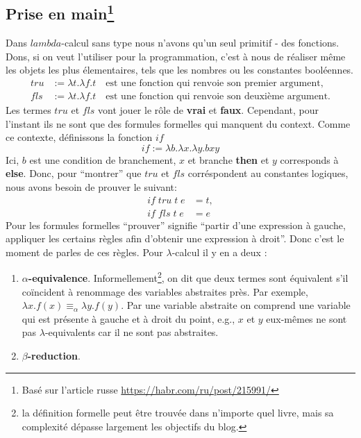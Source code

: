 \documentclass[12pt, a4paper]{article}
\newtheorem*{remark}{Remarque}
\begin{document}
\subsection*{Prise en main\footnote{Basé sur l'article russe \url{https://habr.com/ru/post/215991/}}}
Dans $lambda$-calcul sans type nous n'avons qu'un seul primitif - des fonctions.
Dons, si on veut l'utiliser pour la programmation, c'est à nous de réaliser même les objets les plus élementaires, tels que les nombres ou les constantes booléennes.
\begin{eqnarray*}
tru &:= \lambda t.\lambda f.t \quad \text{est une fonction qui renvoie son premier argument,} \\
fls &:= \lambda t.\lambda f.t \quad \text{est une fonction qui renvoie son deuxième argument.}
\end{eqnarray*}
Les termes $tru$ et $fls$ vont jouer le rôle de \textbf{vrai} et \textbf{faux}.
Cependant, pour l'instant ils ne sont que des formules formelles qui manquent du context.
Comme ce contexte, définissons la fonction $if$
$$if := \lambda b.\lambda x.\lambda y.b x y$$
Ici, $b$ est une condition de branchement, $x$ et branche \textbf{then} et $y$ corresponds à \textbf{else}.
Donc, pour ``montrer'' que $tru$ et $fls$ corréspondent au constantes logiques, nous avons besoin de prouver le suivant:
\begin{eqnarray*}
	if \; tru \; t \; e &= t, \\
	if \; fls \; t \; e &= e
\end{eqnarray*}
Pour les formules formelles ``prouver'' signifie ``partir d'une expression à gauche, appliquer les certains règles afin d'obtenir une expression à droit''.
Donc c'est le moment de parles de ces règles.
Pour $\lambda$-calcul il y en a deux :
\begin{enumerate}
	\item \textbf{$\alpha$-equivalence}. Informellement\footnote{la définition formelle peut être trouvée dans n'importe quel livre, mais sa complexité dépasse largement les objectifs du blog.}, on dit que deux termes sont équivalent s'il coïncident à renommage des variables abstraites près. Par exemple, $\lambda x.f(x) \equiv_\alpha \lambda y.f(y)$.
	Par une variable abstraite on comprend une variable qui est présente à gauche et à droit du point, e.g., $x$ et $y$ eux-mêmes ne sont pas $\lambda$-equivalents car il ne sont pas abstraites.
	\item \textbf{$\beta$-reduction}.
\end{enumerate}
\end{document}
